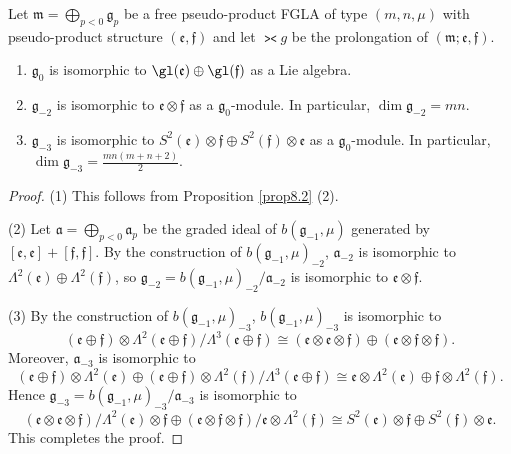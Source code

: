 \begin{proposition}\label{prop8.3} Let $\mathfrak m=\bigoplus\limits_{p<0}\mathfrak g_p$ be a
free pseudo-product FGLA of type $(m,n,\mu)$
with pseudo-product structure $(\mathfrak e,\mathfrak f)$
and let
$\gla g$ be the prolongation of $(\mathfrak m;\mathfrak e,\mathfrak f)$.
\begin{enumerate}\itemsep=0pt
\item
$\mathfrak g_0$ is isomorphic to $\gl(\mathfrak e)\oplus\gl(\mathfrak f)$ as
a Lie algebra.
\item $\mathfrak g_{-2}$ is isomorphic to $\mathfrak e\otimes \mathfrak f$
as a $\mathfrak g_0$-module. In particular,
$\dim\mathfrak g_{-2}=mn$.
\item $\mathfrak g_{-3}$ is isomorphic to
$S^2(\mathfrak e)\otimes
\mathfrak f\oplus S^2(\mathfrak f)\otimes \mathfrak e$
as a $\mathfrak g_0$-module.
In particular,
$\dim\mathfrak g_{-3}=\frac{mn(m+n+2)}2$.
\end{enumerate}
\end{proposition}

\begin{proof} (1) This follows from Proposition \ref{prop8.2} (2).
\par
(2) Let $\mathfrak a=\bigoplus\limits_{p<0}\mathfrak a_p$ be the graded ideal
of $b(\mathfrak g_{-1},\mu)$ generated by
$[\mathfrak e,\mathfrak e]+[\mathfrak f,\mathfrak f]$.
By the construction of $b(\mathfrak g_{-1},\mu)_{-2}$,
$\mathfrak a_{-2}$ is isomorphic to $\Lambda^2(\mathfrak e)\oplus
\Lambda^2(\mathfrak f)$, so
$\mathfrak g_{-2}=b(\mathfrak g_{-1},\mu)_{-2}/\mathfrak a_{-2}$
is isomorphic to $\mathfrak e\otimes \mathfrak f$.

(3) By the construction of $b(\mathfrak g_{-1},\mu)_{-3}$,
$b(\mathfrak g_{-1},\mu)_{-3}$ is isomorphic to
\[
(\mathfrak e\oplus \mathfrak f)\otimes \Lambda^2(\mathfrak e\oplus \mathfrak f)/\Lambda^3(\mathfrak e\oplus \mathfrak f)\cong
(\mathfrak e\otimes \mathfrak e\otimes \mathfrak f)
\oplus
(\mathfrak e\otimes \mathfrak f\otimes \mathfrak f).
\]
Moreover,
$\mathfrak a_{-3}$ is isomorphic to
\[
(\mathfrak e\oplus \mathfrak f)\otimes \Lambda^2(\mathfrak e)
\oplus(\mathfrak e\oplus \mathfrak f)\otimes \Lambda^2(\mathfrak f)/
\Lambda^3(\mathfrak e\oplus \mathfrak f)
\cong \mathfrak e\otimes\Lambda^2(\mathfrak e)\oplus
\mathfrak f\otimes\Lambda^2(\mathfrak f).
\]
Hence
$\mathfrak g_{-3}=b(\mathfrak g_{-1},\mu)_{-3}/\mathfrak a_{-3}$
is isomorphic to
\[
(\mathfrak e\otimes \mathfrak e\otimes \mathfrak f)/
\Lambda^2(\mathfrak e)\otimes\mathfrak f\oplus
(\mathfrak e\otimes \mathfrak f\otimes \mathfrak f)/
\mathfrak e\otimes\Lambda^2(\mathfrak f)
\cong
S^2(\mathfrak e)\otimes
\mathfrak f\oplus S^2(\mathfrak f)\otimes \mathfrak e.
\]
This completes the proof.
\end{proof}

